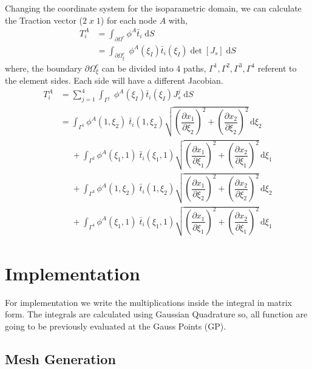 \documentclass[11pt, a4paper]{article}
\numberwithin{equation}{section}
\begin{document}
Changing the coordinate system for the isoparametric domain, we can calculate the Traction vector ($2\;x\;1$) for each node $A$ with,
\begin{align*}
T_i^A &=  \int_{\partial \Omega^e} \phi^A \bar{t}_i \; \mathrm{d} S 
\\
&=
\int_{\partial \Omega^e_\xi} \; \phi^A(\xi_I) \bar{t}_i(\xi_I) \det[J_s]\; \mathrm{d} S
\end{align*}
where, the boundary $\partial \Omega^e_\xi$ can be divided into 4 paths, $\Gamma^1, \Gamma^2, \Gamma^3, \Gamma^4$ referent to the element sides. Each side will have a different Jacobian.
\begin{align*}
T_i^A &= \sum_{j=1}^4 \int_{\Gamma^j} \;  \phi^A(\xi_I) \bar{t}_i(\xi_I) J_s^j \; \mathrm{d} S
\\
&=
\int_{\Gamma^1} \phi^A(1, \xi_2) \; \bar{t}_i(1, \xi_2) \sqrt{\left(\dfrac{\partial x_1}{\partial \xi_2}\right)^2 + \left(\dfrac{\partial x_2}{\partial \xi_2}\right)^2}\, \mathrm{d} \xi_2 
 \\ & \mathrel{\phantom{=}} +
\int_{\Gamma^2} \phi^A(\xi_1, 1) \; \bar{t}_i(\xi_1, 1) \sqrt{\left(\dfrac{\partial x_1}{\partial \xi_1}\right)^2 + \left(\dfrac{\partial x_2}{\partial \xi_1}\right)^2}\, \mathrm{d} \xi_1
 \\ &\mathrel{\phantom{=}} +
\int_{\Gamma^3} \phi^A(1, \xi_2)\;  \bar{t}_i(1, \xi_2) \sqrt{\left(\dfrac{\partial x_1}{\partial \xi_2}\right)^2 + \left(\dfrac{\partial x_2}{\partial \xi_2}\right)^2}\, \mathrm{d} \xi_2 
 \\& \mathrel{\phantom{=}} +
\int_{\Gamma^4} \phi^A(\xi_1, 1) \; \bar{t}_i(\xi_1, 1) \sqrt{\left(\dfrac{\partial x_1}{\partial \xi_1}\right)^2 + \left(\dfrac{\partial x_2}{\partial \xi_1}\right)^2}\, \mathrm{d} \xi_1
\end{align*}


\section{Implementation}

For implementation we write the multiplications inside the integral in matrix form. The integrals are calculated using Gaussian Quadrature so, all function are going to be previously evaluated at the Gauss Points (GP). 


\subsection{Mesh Generation}
\end{document}
